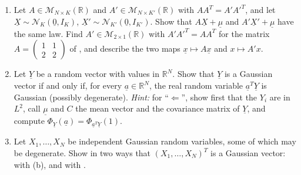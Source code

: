 \begin{exercise}\label{ex:gv-linear-combinations}
\medium
\begin{enumerate}[label=(\alph*)]
  \item Let $A\in\mathcal M_{N\times K}(\mathbb R)$ and $A'\in\mathcal M_{N\times K'}(\mathbb R)$ with
    $AA^T=A'A'^T$, and let $\underline X\sim\mathcal N_K(\underline 0,I_K)$,
    $\underline X'\sim\mathcal N_{K'}(\underline 0,I_{K'})$. Show that $A\underline X+\underline\mu$
    and $A'\underline X'+\underline\mu$ have the same law. Find $A'\in\mathcal M_{2\times1}(\mathbb R)$
    with $A'A'^T=AA^T$ for the matrix $A=\left(\begin{smallmatrix}1&1\\2&2\end{smallmatrix}\right)$ of
    , and describe the two maps $\underline x\mapsto A\underline x$ and
    $x\mapsto A'x$.
  \item Let $\underline Y$ be a random vector with values in $\mathbb R^N$. Show that
    $\underline Y$ is a Gaussian vector if and only if, for every $\underline a\in\mathbb R^N$, the
    real random variable $\underline a^T\underline Y$ is Gaussian (possibly degenerate).
    \emph{Hint:} for ``$\Leftarrow$'', show first that the $Y_i$ are in $L^2$, call
    $\underline\mu$ and $C$ the mean vector and the covariance matrix of $\underline Y$, and compute
    $\Phi_{\underline Y}(\underline a)=\Phi_{\underline a^T\underline Y}(1)$.
  \item Let $X_1,\dots,X_N$ be independent Gaussian random variables, some of which may be
    degenerate. Show in two ways that $(X_1,\dots,X_N)^T$ is a Gaussian vector: with (b), and with
    .
\end{enumerate}
\end{exercise}

